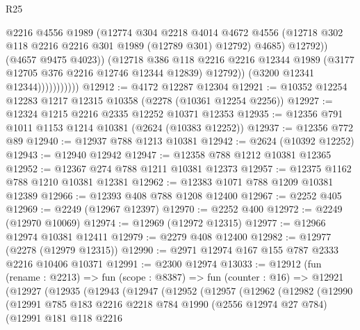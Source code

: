 \begin{lexlean}{R25}
\begin{coremodule}
                                @2216
                                @4556
                                @1989
                                (@12774
                                  @304
                                  @2218
                                  @4014
                                  @4672
                                  @4556
                                  (@12718 @302 @118 @2216 @2216 @301 @1989 (@12789 @301) @12792)
                                  @4685)
                                @12792))
                            (@4657 @9475 @4023))
                          (@12718
                            @386
                            @118
                            @2216
                            @2216
                            @12344
                            @1989
                            (@3177 @12705 @376 @2216 @12746 @12344 @12839)
                            @12792))
                        (@3200 @12341 @12344)))))))))))
@12912 := @4172 @12287 @12304
@12921 := @10352 @12254 @12283 @1217 @12315 @10358 (@2278 (@10361 @12254 @2256))
@12927 := @12324 @1215 @2216 @2335 @12252 @10371 @12353
@12935 := @12356 @791 @1011 @1153 @1214 @10381 (@2624 (@10383 @12252))
@12937 := @12356 @772 @89
@12940 := @12937 @788 @1213 @10381
@12942 := @2624 (@10392 @12252)
@12943 := @12940 @12942
@12947 := @12358 @788 @1212 @10381 @12365
@12952 := @12367 @274 @788 @1211 @10381 @12373
@12957 := @12375 @1162 @788 @1210 @10381 @12381
@12962 := @12383 @1071 @788 @1209 @10381 @12389
@12966 := @12393 @408 @788 @1208 @12400
@12967 := @2252 @405
@12969 := @2249 (@12967 @12397)
@12970 := @2252 @400
@12972 := @2249 (@12970 @10069)
@12974 := @12969 (@12972 @12315)
@12977 := @12966 @12974 @10381 @12411
@12979 := @2279 @408 @12400
@12982 := @12977 (@2278 (@12979 @12315))
@12990 := @2971 @12974 @167 @155 @787 @2333 @2216 @10406 @10371
@12991 := @2300 @12974
@13033 := @12912
    (fun (rename : @2213) =>
    fun (scope : @8387) =>
    fun (counter : @16) =>
    @12921
      (@12927
        (@12935
          (@12943
            (@12947
              (@12952
                (@12957
                  (@12962
                    (@12982
                      (@12990
                        (@12991
                          @785
                          @183
                          @2216
                          @2218
                          @784
                          @1990
                          (@2556 @12974 @27 @784)
                          (@12991
                            @181
                            @118
                            @2216

\end{coremodule}
\end{lexlean}
